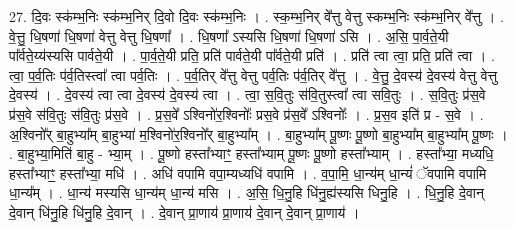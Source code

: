 \documentclass[17pt]{extarticle}
\begin{document}
27. दि॒वः स्क॑म्भ॒निः स्क॑म्भ॒निर् दि॒वो दि॒वः स्क॑म्भ॒निः । . स्क॒म्भ॒निर् वे᳚त्तु वेत्तु स्कम्भ॒निः स्क॑म्भ॒निर् वे᳚त्तु । . वे॒त्तु॒ धि॒षणा॑ धि॒षणा॑ वेत्तु वेत्तु धि॒षणा᳚ । . धि॒षणा᳚ ऽस्यसि धि॒षणा॑ धि॒षणा॑ ऽसि । . अ॒सि॒ पा॒र्व॒ते॒यी पा᳚र्वते॒य्य॑स्यसि पार्वते॒यी । . पा॒र्व॒ते॒यी प्रति॒ प्रति॑ पार्वते॒यी पा᳚र्वते॒यी प्रति॑ । . प्रति॑ त्वा त्वा॒ प्रति॒ प्रति॑ त्वा । . त्वा॒ प॒र्व॒तिः प॑र्व॒तिस्त्वा᳚ त्वा पर्व॒तिः । . प॒र्व॒तिर् वे᳚त्तु वेत्तु पर्व॒तिः प॑र्व॒तिर् वे᳚त्तु । . वे॒त्तु॒ दे॒वस्य॑ दे॒वस्य॑ वेत्तु वेत्तु दे॒वस्य॑ । . दे॒वस्य॑ त्वा त्वा दे॒वस्य॑ दे॒वस्य॑ त्वा । . त्वा॒ स॒वि॒तुः स॑वि॒तुस्त्वा᳚ त्वा सवि॒तुः । . स॒वि॒तुः प्र॑स॒वे प्र॑स॒वे स॑वि॒तुः स॑वि॒तुः प्र॑स॒वे । . प्र॒स॒वे᳚ ऽश्विनो॑र॒श्विनोः᳚ प्रस॒वे प्र॑स॒वे᳚ ऽश्विनोः᳚ । . प्र॒स॒व इति॑ प्र - स॒वे । . अ॒श्विनो᳚र् बा॒हुभ्या᳚म् बा॒हुभ्या॑ म॒श्विनो॑र॒श्विनो᳚र् बा॒हुभ्या᳚म् । . बा॒हुभ्या᳚म् पू॒ष्णः पू॒ष्णो बा॒हुभ्या᳚म् बा॒हुभ्या᳚म् पू॒ष्णः । . बा॒हुभ्या॒मिति॑ बा॒हु - भ्या॒म् । . पू॒ष्णो हस्ता᳚भ्याꣳ॒॒ हस्ता᳚भ्याम् पू॒ष्णः पू॒ष्णो हस्ता᳚भ्याम् । . हस्ता᳚भ्या॒ मध्यधि॒ हस्ता᳚भ्याꣳ॒॒ हस्ता᳚भ्या॒ मधि॑ । . अधि॑ वपामि वपा॒म्यध्यधि॑ वपामि । . व॒पा॒मि॒ धा॒न्य॑म् धा॒न्यं॑ ॅवपामि वपामि धा॒न्य᳚म् । . धा॒न्य॑ मस्यसि धा॒न्य॑म् धा॒न्य॑ मसि । . अ॒सि॒ धि॒नु॒हि धि॑नु॒ह्य॑स्यसि धिनु॒हि । . धि॒नु॒हि दे॒वान् दे॒वान् धि॑नु॒हि धि॑नु॒हि दे॒वान् । . दे॒वान् प्रा॒णाय॑ प्रा॒णाय॑ दे॒वान् दे॒वान् प्रा॒णाय॑ । \newline
\end{document}

